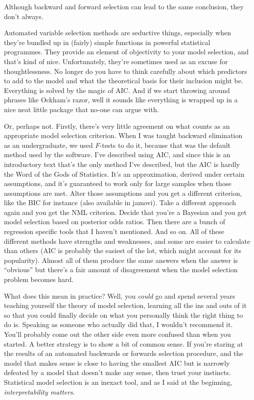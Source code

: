 Although backward and forward selection can lead to the same conclusion, they don't always.


Automated variable selection methods are seductive things, especially when they're bundled up in (fairly) simple functions in powerful statistical programmes. They provide an element of objectivity to your model selection, and that's kind of nice. Unfortunately, they're sometimes used as an excuse for thoughtlessness. No longer do you have to think carefully about which predictors to add to the model and what the theoretical basis for their inclusion might be. Everything is solved by the magic of AIC. And if we start throwing around phrases like Ockham's razor, well it sounds like everything is wrapped up in a nice neat little package that no-one can argue with.

Or, perhaps not. Firstly, there's very little agreement on what counts as an appropriate model selection criterion. When I was taught backward elimination as an undergraduate, we used $F$-tests to do it, because that was the default method used by the software. I've described using AIC, and since this is an introductory text that's the only method I've described, but the AIC is hardly the Word of the Gods of Statistics. It's an approximation, derived under certain assumptions, and it's guaranteed to work only for large samples when those assumptions are met. Alter those assumptions and you get a different criterion, like the BIC for instance (also available in jamovi). Take a different approach again and you get the NML criterion. Decide that you're a Bayesian and you get model selection based on posterior odds ratios. Then there are a bunch of regression specific tools that I haven't mentioned. And so on. All of these different methods have strengths and weaknesses, and some are easier to calculate than others (AIC is probably the easiest of the lot, which might account for its popularity). Almost all of them produce the same answers when the answer is ``obvious'' but there's a fair amount of disagreement when the model selection problem becomes hard.

What does this mean in practice? Well, you {\it could} go and spend several years teaching yourself the theory of model selection, learning all the ins and outs of it so that you could finally decide on what you personally think the right thing to do is. Speaking as someone who actually did that, I wouldn't recommend it. You'll probably come out the other side even more confused than when you started. A better strategy is to show a bit of common sense. If you're staring at the results of an automated backwards or forwards selection procedure, and the model that makes sense is close to having the smallest AIC but is narrowly defeated by a model that doesn't make any sense, then trust your instincts. Statistical model selection is an inexact tool, and as I said at the beginning, {\it interpretability matters}. 

